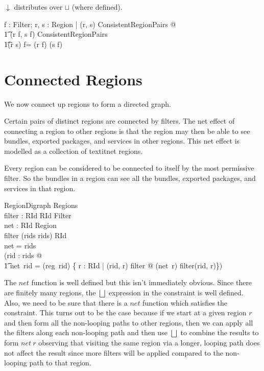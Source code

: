\documentclass[a4paper,9pt]{article}
\begin{document}
$\downarrow$ distributes over $\sqcup$ (where defined).
\begin{argue}
  \shows \forall f : Filter; r, s : Region | (r, s) \in ConsistentRegionPairs @ \\
\t1 (r \downarrow f, s \downarrow f) \in ConsistentRegionPairs \land \\
\t1(r \sqcup s) \downarrow f= (r \downarrow f) \sqcup (s \downarrow f) \\
\end{argue}

\clearpage
\section{Connected Regions}
\label{cha:connregions}

We now connect up regions to form a directed graph.

Certain pairs of distinct regions are connected by filters. The net effect of connecting a region to other
regions is that the region may then be able to see bundles, exported packages, and services in other regions.
This net effect is modelled as a collection of textit{net} regions.

Every region can be considered to be connected to itself by the most permissive filter.
So the bundles in a region can see all the bundles, exported packages, and services in that region.
\begin{schema}{RegionDigraph}
  Regions \\
  filter : RId \cross RId \pfun Filter \\
  net : RId \pfun Region \\
\where
  \dom filter \subseteq (rids \cross rids) \setminus \id RId \\
  \dom net = rids \\
  (\forall rid : rids @ \\
\t1 net~rid = (reg~rid) \sqcup \bigsqcup \{ r : RId | (rid, r) \in \dom filter @ (net~r) \downarrow filter(rid, r)\})\\
\end{schema}

The $net$ function is well defined but this isn't immediately obvious.
Since there are finitely many regions, the $\bigsqcup$ expression in the constraint is well defined.
Also, we need to be sure that there is a $net$ function which satisfies the constraint.
This turns out to be the case because if we start at a given region $r$ and then form all the non-looping
paths to other regions, then we can apply all the filters along each non-looping path and then
use $\bigsqcup$ to combine the results to form $net~r$ observing that visiting the same region via
a longer, looping path does not affect the result since more filters will
be applied compared to the non-looping path to that region.
\end{document}
